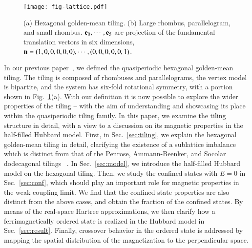 \documentclass[aps,twocolumn,pra,superscriptaddress,amsmath,amssymb]{revtex4-1}
\begin{document}
\begin{figure}[htb]
 \texttt{[image: fig-lattice.pdf]}
 \caption{
   (a) Hexagonal golden-mean tiling.
   (b) Large rhombus, parallelogram, and small rhombus.
   ${\bf e}_0, \cdots, {\bf e}_5$ are projection of
   the fundamental translation vectors in six dimensions,
   ${\bf n}=(1,0,0,0,0,0), \cdots, (0,0,0,0,0,1)$.
 }
 \label{lattice}
\end{figure}

In our previous paper~\cite{Sam}, we defined the quasiperiodic  hexagonal golden-mean tiling. The tiling is composed of rhombuses and parallelograms, the vertex model is bipartite, and the system has six-fold rotational symmetry, with a portion shown in Fig.~\ref{lattice}(a). With our definition it is now possible to explore the wider properties of the tiling -- with the aim of understanding and showcasing its place within the quasiperiodic tiling family. In this paper, we examine the tiling structure in detail, with a view to a discussion on its magnetic properties in the half-filled Hubbard model. First, in Sec.~\ref{sec:tiling}, we explain the hexagonal golden-mean tiling in detail, clarifying the existence of a sublattice imbalance which is distinct from that of the Penrose, Ammann-Beenker, and Socolar dodecagonal tilings ~\cite{Koga_Tsunetsugu,Koga_AB,Koga_dodeca}. In Sec.~\ref{sec:model}, we introduce the half-filled Hubbard model on the hexagonal tiling. Then, we study the confined states with $E=0$ in Sec.~\ref{sec:conf}, which should play an important role for magnetic properties in the weak coupling limit. We find that the confined state properties are also distinct from the above cases, and obtain the fraction of the confined states.
By means of the real-space Hartree approximations,
we then clarify how a ferrimagnetically ordered state is realized in the Hubbard model in Sec.~\ref{sec:result}.
Finally, crossover behavior in the ordered state is addressed
by mapping the spatial distribution of the magnetization to the perpendicular space. 




\end{document}
